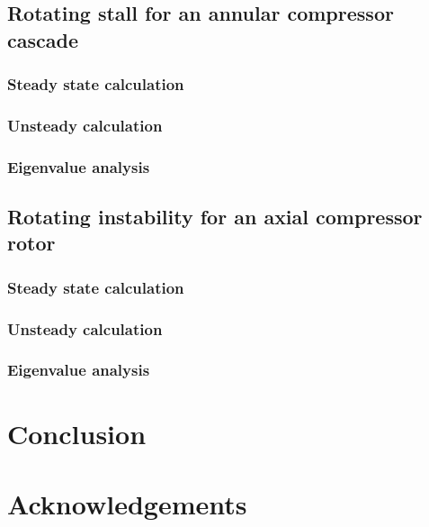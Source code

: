 \documentclass[journal,final]{new-aiaa}
\begin{document}
\subsection{Rotating stall for an annular compressor cascade}

\subsubsection{Steady state calculation}
\subsubsection{Unsteady calculation}
\subsubsection{Eigenvalue analysis}

\subsection{Rotating instability for an axial compressor rotor}

\subsubsection{Steady state calculation}
\subsubsection{Unsteady calculation}
\subsubsection{Eigenvalue analysis}

\section{Conclusion}
\label{conclusion}

\section*{Acknowledgements}


\end{document}
